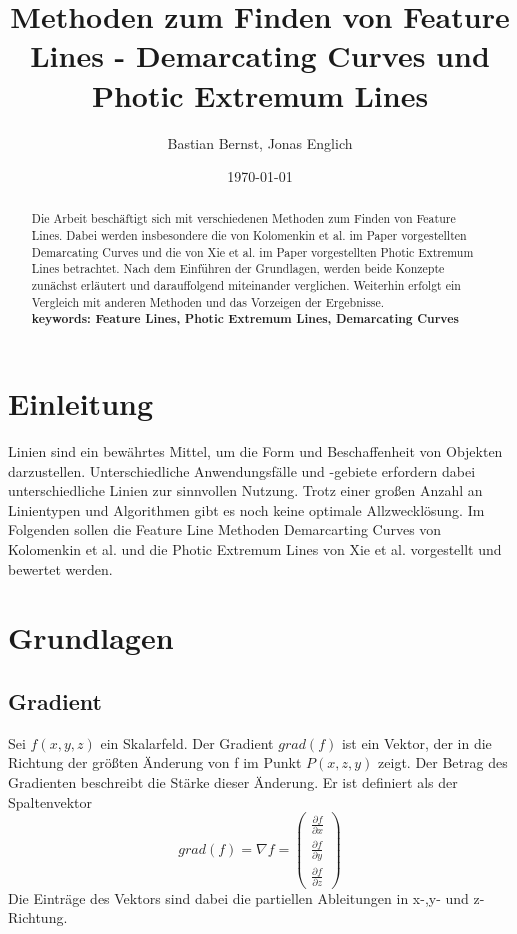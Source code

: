 \documentclass{paperStyle}
\title{Methoden zum Finden von Feature Lines - Demarcating Curves und Photic Extremum Lines}
\author{Bastian Bernst, Jonas Englich}
\date{\today}
\begin{document}
\maketitle

\begin{abstract}
   Die Arbeit beschäftigt sich mit verschiedenen Methoden zum Finden von Feature Lines. Dabei werden insbesondere die von Kolomenkin et al. im Paper \cite{Demarcating} vorgestellten Demarcating Curves und die von Xie et al. im Paper \cite{Xie2007} vorgestellten Photic Extremum Lines betrachtet. Nach dem Einführen der Grundlagen, werden beide Konzepte zunächst erläutert und darauffolgend miteinander verglichen. Weiterhin erfolgt ein Vergleich mit anderen Methoden und das Vorzeigen der Ergebnisse.
    \\
\textbf{keywords: Feature Lines, Photic Extremum Lines, Demarcating Curves}

\end{abstract}

\section{Einleitung}
Linien sind ein bewährtes Mittel, um die Form und Beschaffenheit von Objekten darzustellen. Unterschiedliche Anwendungsfälle und -gebiete erfordern dabei unterschiedliche Linien zur sinnvollen Nutzung. Trotz einer großen Anzahl an Linientypen und Algorithmen gibt es noch keine optimale Allzwecklösung.
	Im Folgenden sollen die Feature Line Methoden Demarcarting Curves von Kolomenkin et al.\cite{Demarcating} und die Photic Extremum Lines von Xie et al.\cite{Xie2007} vorgestellt und bewertet werden.
\section{Grundlagen}

\subsection{Gradient}

Sei $f(x,y,z)$ ein Skalarfeld. Der Gradient $grad(f)$ ist ein Vektor, der in die Richtung der größten Änderung von f im Punkt $P(x,z,y)$ zeigt. Der Betrag des Gradienten beschreibt die Stärke dieser Änderung. Er ist definiert als der Spaltenvektor
\begin{equation}
grad(f) = \nabla f = \left(\begin{array}{c}\frac{\partial f}{\partial x} \\ \frac{\partial f}{\partial y} \\ \frac{\partial f}{\partial z}\end{array}\right)
\end{equation} 
Die Einträge des Vektors sind dabei die partiellen Ableitungen in x-,y- und z-Richtung.
\end{document}

